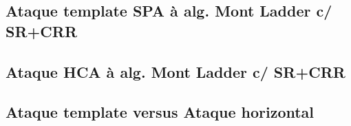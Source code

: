 \subsection{Ataque template SPA à alg. Mont Ladder c/ SR+CRR}

\subsection{Ataque HCA à alg. Mont Ladder c/ SR+CRR}

\subsection{Ataque template versus Ataque horizontal}

